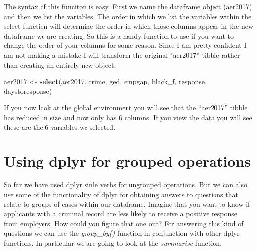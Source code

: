 \documentclass[]{book}
\newenvironment{Shaded}{\begin{snugshade}}{\end{snugshade}}
\newcommand{\KeywordTok}[1]{\textcolor[rgb]{0.13,0.29,0.53}{\textbf{#1}}}
\newcommand{\NormalTok}[1]{#1}
\newcommand{\StringTok}[1]{\textcolor[rgb]{0.31,0.60,0.02}{#1}}
\theoremstyle{definition}
\theoremstyle{definition}
\theoremstyle{definition}
\theoremstyle{remark}
\begin{document}
The syntax of this funciton is easy. First we name the dataframe object
(aer2017) and then we list the variables. The order in which we list the
variables within the select function will determine the order in which
those columns appear in the new dataframe we are creating. So this is a
handy function to use if you want to change the order of your columns
for some reason. Since I am pretty confident I am not making a mistake I
will transform the original ``aer2017'' tibble rather than creating an
entirely new object.

\begin{Shaded}
\begin{Highlighting}[]
\NormalTok{aer2017 <-}\StringTok{ }\KeywordTok{select}\NormalTok{(aer2017, crime, ged, empgap, black_f, response, daystoresponse)}
\end{Highlighting}
\end{Shaded}

If you now look at the global environment you will see that the
``aer2017'' tibble has reduced in size and now only has 6 columns. If
you view the data you will see these are the 6 variables we selected.

\hypertarget{using-dplyr-for-grouped-operations}{%
\section{Using dplyr for grouped
operations}\label{using-dplyr-for-grouped-operations}}

So far we have used dplyr sinle verbs for ungrouped operations. But we
can also use some of the functionality of dplyr for obtaining answers to
questions that relate to groups of cases within our dataframe. Imagine
that you want to know if applicants with a criminal record are less
likely to receive a positive response from employers. How could you
figure that one out? For answering this kind of questions we can use the
\emph{group\_by()} function in conjunction with other dplyr functions.
In particular we are going to look at the \emph{summarise} function.
\end{document}
